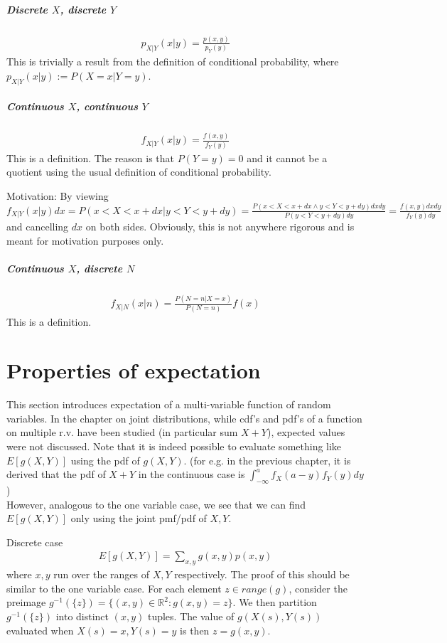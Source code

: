 \documentclass{article}
\begin{document}
\subparagraph{Discrete $X$, discrete $Y$}
\begin{align*}
	p_{X|Y}(x|y) = \frac{p(x,y)}{p_Y(y)}
\end{align*}
This is trivially a result from the definition of conditional probability, where $p_{X|Y}(x|y) := P(X=x | Y=y)$.

\subparagraph{Continuous $X$, continuous $Y$}
\begin{align*}
	f_{X|Y}(x|y) = \frac{f(x,y)}{f_Y(y)}
\end{align*}
This is a definition. The reason is that $P(Y=y) = 0$ and it cannot be a quotient using the usual definition of conditional probability.

Motivation: By viewing $f_{X|Y}(x|y)dx = P(x<X<x+dx|y<Y<y+dy)=\frac{P(x<X<x+dx\land y<Y<y+dy)dxdy}{P(y<Y<y+dy)dy}=\frac{f(x,y)dxdy}{f_Y(y)dy}$ and cancelling $dx$ on both sides. Obviously, this is not anywhere rigorous and is meant for motivation purposes only.

\subparagraph{Continuous $X$, discrete $N$}
\begin{align*}
	f_{X|N}(x|n) = \frac{P(N=n|X=x)}{P(N=n)}f(x)
\end{align*}
This is a definition.

\section{Properties of expectation}
This section introduces expectation of a multi-variable function of random variables. In the chapter on joint distributions, while cdf's and pdf's of a function on multiple r.v. have been studied (in particular sum $X+Y$), expected values were not discussed. Note that it is indeed possible to evaluate something like $E[g(X,Y)]$ using the pdf of $g(X,Y)$. (for e.g. in the previous chapter, it is derived that the pdf of $X+Y$ in the continuous case is $\int_{-\infty}^a f_X(a-y)f_Y(y)dy$)\\
However, analogous to the one variable case, we see that we can find $E[g(X,Y)]$ only using the joint pmf/pdf of $X,Y$.

Discrete case
\begin{align*}
	E[g(X, Y)] = \sum_{x,y}g(x,y)p(x,y)
\end{align*}
where $x,y$ run over the ranges of $X,Y$ respectively. The proof of this should be similar to the one variable case. For each element $z\in range(g)$, consider the preimage $g^{-1}(\{z\})=\{(x,y)\in \mathbb{R}^2 : g(x,y) = z\}$. We then partition $g^{-1}(\{z\})$ into distinct $(x,y)$ tuples. The value of $g(X(s),Y(s))$ evaluated when $X(s)=x,Y(s)=y$ is then $z=g(x,y)$.
\end{document}
